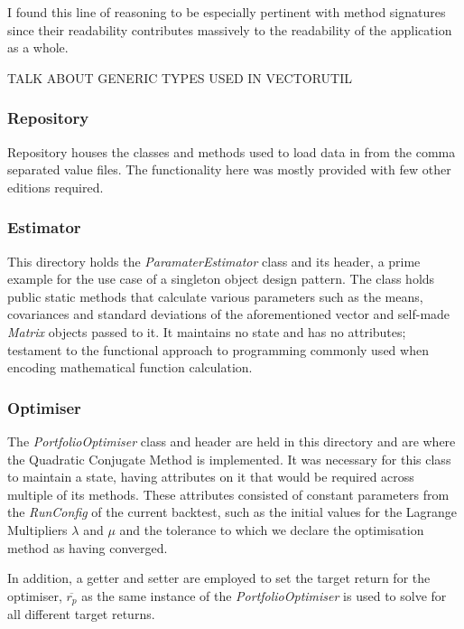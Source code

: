 \documentclass{article}
\begin{document}
I found this line of reasoning to be especially pertinent with method signatures since their readability contributes massively to the readability of the application as a whole.  


TALK ABOUT GENERIC TYPES USED IN VECTORUTIL

\subsubsection{Repository}
\label{sec:repository}

Repository houses the classes and methods used to load data in from the comma separated value files. The functionality here was mostly provided with few other editions required.


\subsubsection{Estimator}
\label{sec:parameter_estimation}

This directory holds the \textit{ParamaterEstimator} class and its header, a prime example for the use case of a singleton object design pattern. The class holds public static methods that calculate various parameters such as the means, covariances and standard deviations of the aforementioned vector and self-made \textit{Matrix} objects passed to it. It maintains no state and has no attributes; testament to the functional approach to programming commonly used when encoding mathematical function calculation.

\subsubsection{Optimiser}
\label{sec:portfolio_optimiser}

The \textit{PortfolioOptimiser} class and header are held in this directory and are where the Quadratic Conjugate Method is implemented. It was necessary for this class to maintain a state, having attributes on it that would be required across multiple of its methods. These attributes consisted of constant parameters from the \textit{RunConfig} of the current backtest, such as the initial values for the Lagrange Multipliers $\lambda$ and $\mu$ and the tolerance to which we declare the optimisation method as having converged.

In addition, a getter and setter are employed to set the target return for the optimiser, $\overline{r_p}$ as the same instance of the \textit{PortfolioOptimiser} is used to solve for all different target returns.
\end{document}
